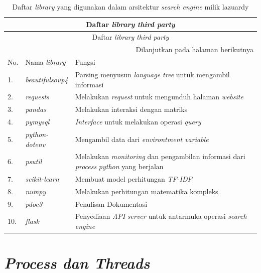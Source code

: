   \begin{center}
    \begin{longtable}{ |p{1cm}|p{4cm}|p{5cm}| }
      \caption{Daftar \emph{library} yang digunakan dalam arsitektur \emph{search engine} milik lazuardy \citep{lazuardithesis}} \\ \hline

      \multicolumn{3}{|c|}{Daftar \emph{library} \emph{third party}} \\ \hline
      \endfirsthead

      \hline \multicolumn{3}{|c|}{Daftar \emph{library} \emph{third party}} \\ \hline
      \endhead

      \hline \multicolumn{3}{r}{{Dilanjutkan pada halaman berikutnya}} \\
      \endfoot

      \hline \hline
      \endlastfoot

      No.& Nama \emph{library}& Fungsi \\ \hline
      1.& \emph{beautifulsoup4}& Parsing menyusun \emph{language tree} untuk mengambil informasi \\ \hline
      2.& \emph{requests}& Melakukan \emph{request} untuk mengunduh halaman \emph{website} \\ \hline
      3.& \emph{pandas}& Melakukan interaksi dengan matriks \\ \hline
      4.& \emph{pymysql}& \emph{Interface} untuk melakukan operasi \emph{query} \\ \hline
      5.& \emph{python-dotenv}& Mengambil data dari \emph{environtment variable} \\ \hline
      6.& \emph{psutil}& Melakukan \emph{monitoring} dan pengambilan informasi dari \emph{process} \emph{python} yang berjalan \\ \hline
      7.& \emph{scikit-learn}& Membuat model perhitungan \emph{TF-IDF} \\ \hline
      8.& \emph{numpy}& Melakukan perhitungan matematika kompleks \\ \hline
      9.& \emph{pdoc3}& Penulisan Dokumentasi \\ \hline
      10.& \emph{flask}& Penyediaan \emph{API} \emph{server} untuk antarmuka operasi \emph{search engine} \\ \hline
    \end{longtable}
  \end{center}

\section{\emph{Process dan Threads}}


